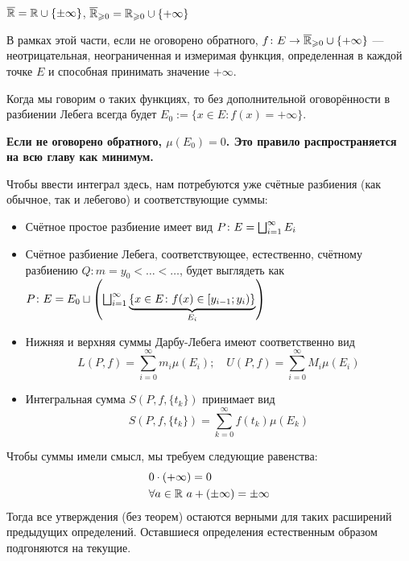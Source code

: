 \begin{designation}
	$\overline{\mathbb{R}} = \mathbb{R} \cup \{\pm\infty\}$, $\overline{\mathbb{R}}_{\geqslant 0} = \mathbb{R}_{\geqslant 0} \cup \{+\infty\}$
\end{designation}

\begin{note}
	В рамках этой части, если не оговорено обратного, $f \colon E \to \overline{\mathbb{R}}_{\geqslant 0} \cup \{+\infty\}$ --- неотрицательная, неограниченная и измеримая функция, определенная в каждой точке $E$ и способная принимать значение $+\infty$.
\end{note}

\begin{designation}
	Когда мы говорим о таких функциях, то без дополнительной оговорённости в разбиении Лебега всегда будет $E_0 := \{x \in E \colon f(x) = +\infty\}$.
\end{designation}

\begin{note}
	\textbf{Если не оговорено обратного, $\mu(E_0) = 0$. Это правило распространяется на всю главу как минимум.}
\end{note}

\begin{note}
	Чтобы ввести интеграл здесь, нам потребуются уже счётные разбиения (как обычное, так и лебегово) и соответствующие суммы:
	\begin{itemize}
		\item Счётное простое разбиение имеет вид $P \colon E = \bigsqcup_{i = 1}^\infty E_i$
		
		\item Счётное разбиение Лебега, соответствующее, естественно, счётному разбиению $Q \colon m = y_0 < \ldots < \ldots$, будет выглядеть как $P \colon E = E_0 \sqcup \left(\bigsqcup_{i = 1}^\infty \underbrace{\{x \in E \colon f(x) \in \left[y_{i - 1}; y_i\right)\}}_{E_i}\right)$
		
		\item Нижняя и верхняя суммы Дарбу-Лебега имеют соответственно вид
		\[
			L(P, f) = \sum_{i = 0}^\infty m_i \mu(E_i); \quad U(P, f) = \sum_{i = 0}^\infty M_i \mu(E_i)
		\]
		
		\item Интегральная сумма $S(P, f, \{t_k\})$ принимает вид
		\[
			S(P, f, \{t_k\}) = \sum_{k = 0}^\infty f(t_k) \mu(E_k)
		\]
	\end{itemize}
\end{note}

\begin{note}
	Чтобы суммы имели смысл, мы требуем следующие равенства:
	\begin{align*}
		&{0 \cdot (+\infty) = 0}
		\\
		&{\forall a \in \mathbb{R}\ a + (\pm\infty) = \pm\infty}
	\end{align*}
	Тогда все утверждения (без теорем) остаются верными для таких расширений предыдущих определений. Оставшиеся определения естественным образом подгоняются на текущие.
\end{note}


